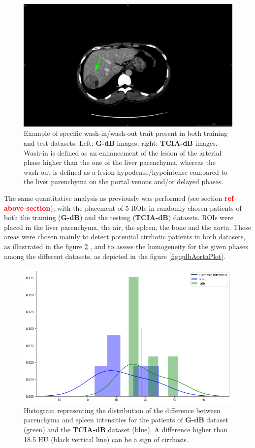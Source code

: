 \documentclass[]{article}
\newcommand{\lmttfont}[1]{{\fontfamily{lmtt}\selectfont #1}}
\begin{document}
\begin{figure}[!ht]
\begin{minipage}{0.45\linewidth}
	\end{minipage} \hspace{-0.1cm}
	\begin{minipage}{0.45\linewidth}
		\includegraphics[width=\linewidth]{../Contributions/images/ImagingTraits/ResizeTCIA_washout}
	\end{minipage}
	\caption{Example of specific wash-in/wash-out trait present in both training and test datasets. Left: \textbf{\lmttfont{G-dB}} images, right: \textbf{\lmttfont{TCIA-dB}} images.
	Wash-in is defined as an enhancement of the lesion of the arterial phase higher than the one of the liver parenchyma, whereas the wash-out is defined as a lesion hypodense/hypointense compared to the liver parenchyma on the portal venous and/or delayed phases.}
	\label{fig:InterDb_imagingTraits3}
\end{figure}
The same quantitative analysis as previously was performed (see section \textcolor{red}{\textbf{ref above section}}), with the placement of 5 ROIs in randomly chosen patients of both the training (\textbf{\lmttfont{G-dB}}) and the testing (\textbf{\lmttfont{TCIA-dB}}) datasets. ROIs were placed in the liver parenchyma, the air, the spleen, the bone and the aorta. These areas were chosen mainly to detect potential cirrhotic patients in both datasets, as illustrated in the figure \ref{fig:cirrhoticPatPlot} , and to assess the homogeneity for the given phases among the different datasets, as depicted in the figure \ref{fig:gdbAortaPlot}. 
\begin{figure}[!ht]
	\centering
	\includegraphics[width=0.6\linewidth]{../Contributions/images/Gdb_TCIA_cirrhosisPlot_bins5}
	\caption{Histogram representing the distribution of the difference between parenchyma and spleen intensities for the patients of  \textbf{\lmttfont{G-dB}} dataset (green) and the  \textbf{\lmttfont{TCIA-dB}} dataset (blue). A difference higher than 18.5 HU (black vertical line) can be a sign of cirrhosis.
	}
	\label{fig:cirrhoticPatPlot}
\end{figure}
\end{document}
